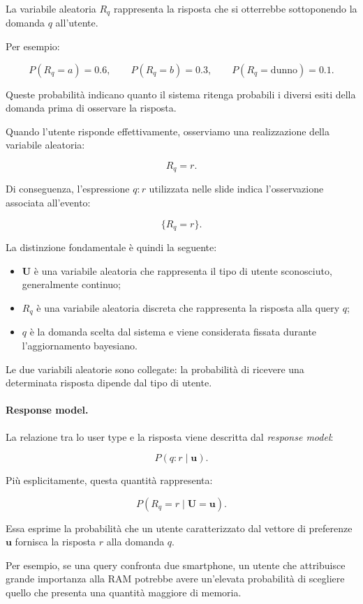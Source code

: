 La variabile aleatoria $R_q$ rappresenta la risposta che si otterrebbe sottoponendo la domanda $q$ all'utente.

Per esempio:

\[
P(R_q=a)=0.6,
\qquad
P(R_q=b)=0.3,
\qquad
P(R_q=\text{dunno})=0.1.
\]

Queste probabilità indicano quanto il sistema ritenga probabili i diversi esiti della domanda prima di osservare la risposta.

Quando l'utente risponde effettivamente, osserviamo una realizzazione della variabile aleatoria:

\[
R_q=r.
\]

Di conseguenza, l'espressione $q:r$ utilizzata nelle slide indica l'osservazione associata all'evento:

\[
\{R_q=r\}.
\]

La distinzione fondamentale è quindi la seguente:

\begin{itemize}
    \item $\mathbf{U}$ è una variabile aleatoria che rappresenta il tipo di utente sconosciuto, generalmente continuo;
    \item $R_q$ è una variabile aleatoria discreta che rappresenta la risposta alla query $q$;
    \item $q$ è la domanda scelta dal sistema e viene considerata fissata durante l'aggiornamento bayesiano.
\end{itemize}

Le due variabili aleatorie sono collegate: la probabilità di ricevere una determinata risposta dipende dal tipo di utente.

\paragraph{Response model.}

La relazione tra lo user type e la risposta viene descritta dal \textit{response model}:

\[
P(q:r\mid\mathbf{u}).
\]

Più esplicitamente, questa quantità rappresenta:

\[
P(R_q=r\mid\mathbf{U}=\mathbf{u}).
\]

Essa esprime la probabilità che un utente caratterizzato dal vettore di preferenze $\mathbf{u}$ fornisca la risposta $r$ alla domanda $q$.

Per esempio, se una query confronta due smartphone, un utente che attribuisce grande importanza alla RAM potrebbe avere un'elevata probabilità di scegliere quello che presenta una quantità maggiore di memoria.

